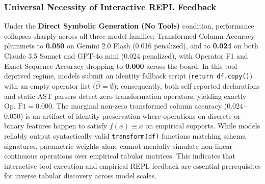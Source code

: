 \documentclass[sigconf]{acmart}
\begin{document}
\subsubsection{Universal Necessity of Interactive REPL Feedback}
Under the \textbf{Direct Symbolic Generation (No Tools)} condition, performance collapses sharply across all three model families: Transformed Column Accuracy plummets to \textbf{0.050} on Gemini 2.0 Flash (0.016 penalized), and to \textbf{0.024} on both Claude 3.5 Sonnet and GPT-4o mini (0.024 penalized), with Operator F1 and Exact Sequence Accuracy dropping to \textbf{0.000} across the board. In this tool-deprived regime, models submit an identity fallback script (\texttt{return df.copy()}) with an empty operator list ($\widehat{\mathcal{O}} = \emptyset$); consequently, both self-reported declarations and static AST parsers detect zero transformation operators, yielding exactly $\text{Op.~F1} = 0.000$. The marginal non-zero transformed column accuracy ($0.024$--$0.050$) is an artifact of identity preservation where operations on discrete or binary features happen to satisfy $f(x) \equiv x$ on empirical supports. While models reliably output syntactically valid \texttt{transform(df)} functions matching schema signatures, parametric weights alone cannot mentally simulate non-linear continuous operations over empirical tabular matrices. This indicates that interactive tool execution and empirical REPL feedback are essential prerequisites for inverse tabular discovery across model scales.
\end{document}
